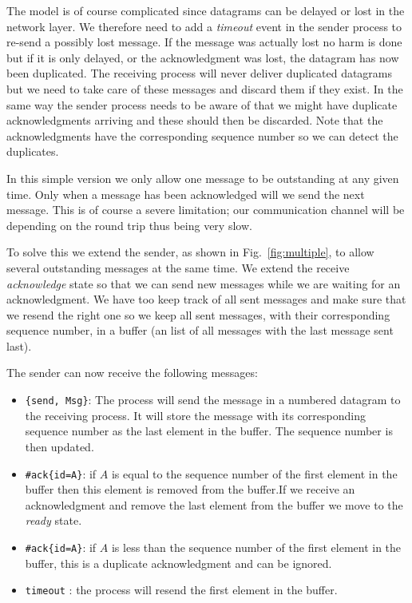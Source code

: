 \documentclass[a4paper,11pt]{article}
\begin{document}
The model is of course complicated since datagrams can be delayed or
lost in the network layer. We therefore need to add a {\em timeout}
event in the sender process to re-send a possibly lost message. If the
message was actually lost no harm is done but if it is only delayed,
or the acknowledgment was lost, the datagram has now been
duplicated. The receiving process will never deliver duplicated
datagrams but we need to take care of these messages and discard them
if they exist. In the same way the sender process needs to be aware of
that we might have duplicate acknowledgments arriving and these should
then be discarded. Note that the acknowledgments have the
corresponding sequence number so we can detect the duplicates.

In this simple version we only allow one message to be outstanding at
any given time. Only when a message has been acknowledged will we send
the next message. This is of course a severe limitation; our
communication channel will be depending on the round trip thus being
very slow.

To solve this we extend the sender, as shown in Fig.~\ref{fig:multiple}, to allow several outstanding
messages at the same time. We extend the receive {\em acknowledge}
state so that we can send new messages while we are waiting for an
acknowledgment. We have too keep track of all sent messages and make
sure that we resend the right one so we keep all sent messages, with
their corresponding sequence number, in a buffer (an list of all
messages with the last message sent last).

The sender can now receive the following messages:

\begin{itemize}
\item {\tt \{send, Msg\}}: The process will send the message in a
  numbered datagram to the receiving process. It will store the
  message with its corresponding sequence number as the last element in
  the buffer. The sequence number is then updated.

\item {\tt \#ack\{id=A\}}: if $A$
  is equal to the sequence number of the first element in the buffer
  then this element is removed from the buffer.If we receive an
  acknowledgment and remove the last element from the buffer we move
  to the {\em ready} state.

\item {\tt \#ack\{id=A\}}: if $A$
  is less than the sequence number of the first element in the buffer,
  this is a duplicate acknowledgment and can be ignored.

\item {\tt timeout} : the process will resend the first element in the buffer.

\end{itemize}
\end{document}
